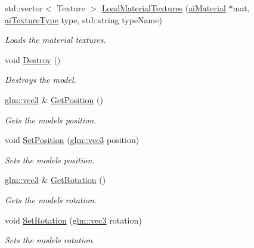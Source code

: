\begin{CompactItemize}
std::vector$<$ Texture $>$ \hyperlink{class_model_43da250403b6d11aa1a0f54c9021ac45}{LoadMaterialTextures} (\hyperlink{structai_material}{aiMaterial} $\ast$mat, \hyperlink{material_8h_7dd415ff703a2cc53d1c22ddbbd7dde0}{aiTextureType} type, std::string typeName)
\begin{CompactList}\small\item\em Loads the material textures. \item\end{CompactList}\item 
void \hyperlink{class_model_d60ed0ed7eaa7dcdd58398e6efacc7c4}{Destroy} ()
\begin{CompactList}\small\item\em Destroys the model. \item\end{CompactList}\item 
\hyperlink{group__core__types_g1c47e8b3386109bc992b6c48e91b0be7}{glm::vec3} \& \hyperlink{class_model_f4b5a0bae6b0b057c118444189c5dfa9}{GetPosition} ()
\begin{CompactList}\small\item\em Gets the models position. \item\end{CompactList}\item 
void \hyperlink{class_model_3a615a604e26270bd0849462718703b2}{SetPosition} (\hyperlink{group__core__types_g1c47e8b3386109bc992b6c48e91b0be7}{glm::vec3} position)
\begin{CompactList}\small\item\em Sets the models position. \item\end{CompactList}\item 
\hyperlink{group__core__types_g1c47e8b3386109bc992b6c48e91b0be7}{glm::vec3} \& \hyperlink{class_model_fc6593eeb0980053628cd00a75be51e9}{GetRotation} ()
\begin{CompactList}\small\item\em Gets the models rotation. \item\end{CompactList}\item 
void \hyperlink{class_model_71aa61e54f3f12bc86175fa359079d23}{SetRotation} (\hyperlink{group__core__types_g1c47e8b3386109bc992b6c48e91b0be7}{glm::vec3} rotation)
\begin{CompactList}\small\item\em Sets the models rotation. \item\end{CompactList}\item 

\end{CompactItemize}
